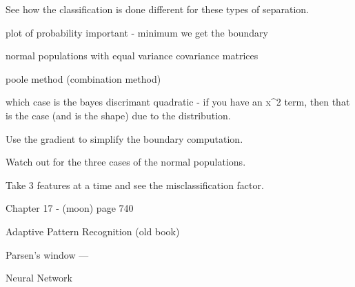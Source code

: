 See how the classification is done different for these types of separation.  

plot of probability important - minimum we get the boundary

normal populations with equal variance covariance matrices

poole method  (combination method)

which case is the bayes discrimant quadratic -  if you have an x^2 term, then that is the case (and is the shape) due to the distribution.  

Use the gradient to simplify the boundary computation.  

Watch out for the three cases of the normal populations.  

Take 3 features at a time and see the misclassification factor.  

Chapter 17 - (moon)  page 740

Adaptive Pattern Recognition (old book)


Parsen's window   ---

Neural Network